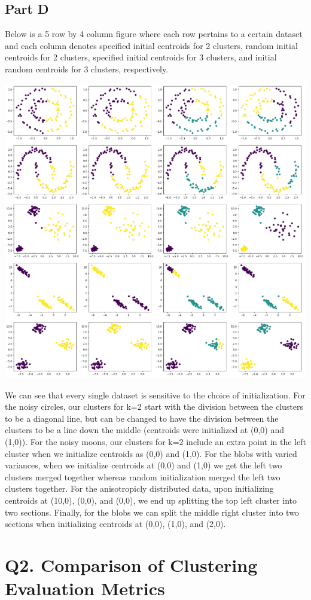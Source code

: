 \documentclass{article}
\begin{document}
\subsection*{Part D}
Below is a 5 row by 4 column figure where each row pertains to a certain dataset and each column denotes 
specified initial centroids for 2 clusters, random initial centroids for 2 clusters, specified initial 
centroids for 3 clusters, and initial random centroids for 3 clusters, respectively.

\includegraphics[width=\linewidth]{Images/Screenshot 2024-03-04 175453.png}

We can see that every single dataset is sensitive to the choice of initialization. For the noisy circles, 
our clusters for k=2 start with the division between the clusters to be a diagonal line, but can be changed 
to have the division between the clusters to be a line down the middle (centroids were initialized at 
(0,0) and (1,0)). For the noisy moons, our clusters for k=2 include an extra point in the left cluster 
when we initialize centroids as (0,0) and (1,0). For the blobs with varied variances, when we initialize 
centroids at (0,0) and (1,0) we get the left two clusters merged together whereas random initialization 
merged the left two clusters together. For the anisotropicly distributed data, upon initializing centroids 
at (10,0), (0,0), and (0,0), we end up splitting the top left cluster into two sections. Finally, for the 
blobs we can split the middle right cluster into two sections when initializing centroids at (0,0), (1,0), 
and (2,0).

\section*{Q2. Comparison of Clustering Evaluation Metrics}
\end{document}

